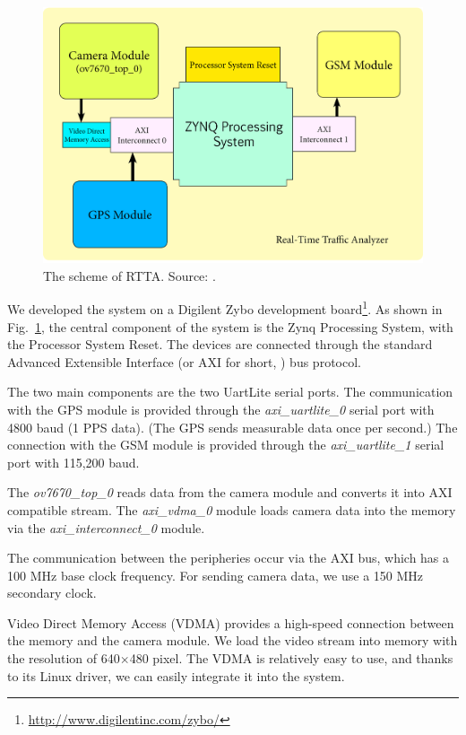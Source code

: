 \documentclass[b5paper,12pt]{report}
\theoremstyle{definition}
\begin{document}
\begin{figure}[ht]
\centerline{
\includegraphics[width=12cm]{img/sema.png}}
\caption{The scheme of RTTA. Source: \cite{usingcoginfocom}.}
\label{rttaschema}
\end{figure}  

We developed the system on a Digilent Zybo development board\footnote{\url{http://www.digilentinc.com/zybo/}}. As shown in Fig.~\ref{rttaschema}, the central component of the system is the Zynq Processing System, with the Processor System Reset. The devices are connected through the standard Advanced Extensible Interface (or AXI for short, \cite{xilinx1999reference}) bus protocol. 

The two main components are the two UartLite serial ports. The communication with the GPS module is provided through the \emph{axi\_uartlite\_0} serial port with 4800 baud (1 PPS data). (The GPS sends measurable data once per second.) The connection with the GSM module is provided through the \emph{axi\_uartlite\_1} serial port with 115,200 baud. 

The \emph{ov7670\_top\_0} reads data from the camera module and converts it into AXI compatible stream. The \emph{axi\_vdma\_0} module loads camera data into the memory via the \emph{axi\_interconnect\_0} module. 

The communication between the peripheries occur via the AXI bus, which has a 100 MHz base clock frequency. For sending camera data, we use a 150 MHz secondary clock.

Video Direct Memory Access (VDMA) provides a high-speed connection between the memory and the camera module. We load the video stream into memory with the resolution of 640$\times$480 pixel. The VDMA is relatively easy to use, and thanks to its Linux driver, we can easily integrate it into the system.
\end{document}
